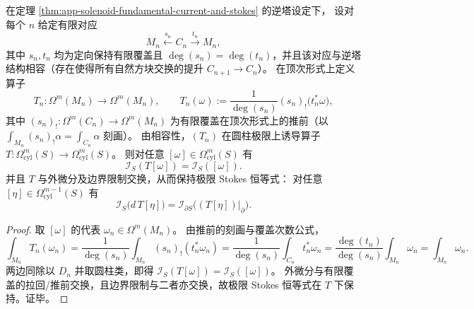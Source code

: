 \begin{proposition}\label{prop:app-solenoid-stokes-equivariance-finite-correspondence}
在定理 \ref{thm:app-solenoid-fundamental-current-and-stokes} 的逆塔设定下，
设对每个 \(n\) 给定有限对应
\[
M_n\xleftarrow{s_n}C_n\xrightarrow{t_n}M_n,
\]
其中 \(s_n,t_n\) 均为定向保持有限覆盖且 \(\deg(s_n)=\deg(t_n)\)，并且该对应与逆塔结构相容（存在使得所有自然方块交换的提升 \(C_{n+1}\to C_n\)）。
在顶次形式上定义算子
\[
T_n:\Omega^{m}(M_n)\to\Omega^{m}(M_n),\qquad
T_n(\omega):=\frac{1}{\deg(s_n)}(s_n)_!\bigl(t_n^\ast\omega\bigr),
\]
其中 \((s_n)_!:\Omega^{m}(C_n)\to\Omega^{m}(M_n)\) 为有限覆盖在顶次形式上的推前（以
\(\int_{M_n}(s_n)_!\alpha=\int_{C_n}\alpha\)
刻画）。
由相容性，\((T_n)\) 在圆柱极限上诱导算子 \(T:\Omega^{m}_{\mathrm{cyl}}(S)\to\Omega^{m}_{\mathrm{cyl}}(S)\)。
则对任意 \([\omega]\in\Omega^{m}_{\mathrm{cyl}}(S)\) 有
\[
\mathcal I_S(T[\omega])=\mathcal I_S([\omega]).
\]
并且 \(T\) 与外微分及边界限制交换，从而保持极限 Stokes 恒等式：
对任意 \([\eta]\in\Omega^{m-1}_{\mathrm{cyl}}(S)\) 有
\[
\mathcal I_S\bigl(d\,T[\eta]\bigr)=\mathcal I_{\partial S}\bigl((T[\eta])|_{\partial}\bigr).
\]
\end{proposition}
\begin{proof}
取 \([\omega]\) 的代表 \(\omega_n\in\Omega^{m}(M_n)\)。
由推前的刻画与覆盖次数公式，
\[
\int_{M_n}T_n(\omega_n)
=\frac{1}{\deg(s_n)}\int_{M_n}(s_n)_!(t_n^\ast\omega_n)
=\frac{1}{\deg(s_n)}\int_{C_n}t_n^\ast\omega_n
=\frac{\deg(t_n)}{\deg(s_n)}\int_{M_n}\omega_n
=\int_{M_n}\omega_n.
\]
两边同除以 \(D_n\) 并取圆柱类，即得 \(\mathcal I_S(T[\omega])=\mathcal I_S([\omega])\)。
外微分与有限覆盖的拉回/推前交换，且边界限制与二者亦交换，故极限 Stokes 恒等式在 \(T\) 下保持。证毕。
\end{proof}





